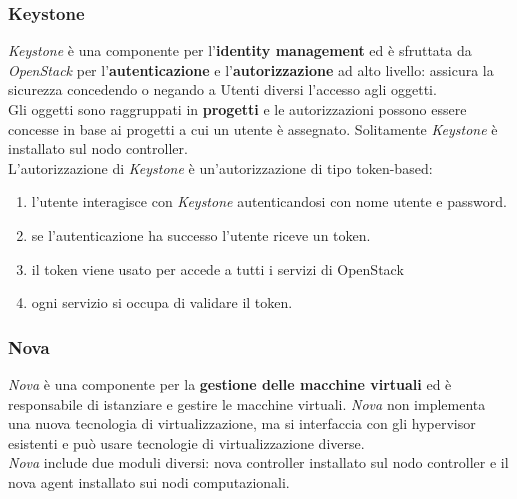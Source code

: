 \documentclass{article}
\begin{document}
\subsubsection{Keystone}
\textit{Keystone} è una componente per l'\textbf{identity management} ed è sfruttata da \textit{OpenStack} per l'\textbf{autenticazione} e l'\textbf{autorizzazione} ad alto livello: assicura la sicurezza concedendo o negando a Utenti diversi l'accesso agli oggetti.\\
Gli oggetti sono raggruppati in \textbf{progetti} e le autorizzazioni possono essere concesse in base ai progetti a cui un utente è assegnato.
Solitamente \textit{Keystone} è installato sul nodo controller.\\
L'autorizzazione di \textit{Keystone} è un'autorizzazione di tipo token-based: \begin{enumerate}
    \item l'utente interagisce con \textit{Keystone} autenticandosi con nome utente e password.
    \item se l'autenticazione ha successo l'utente riceve un token.
    \item il token viene usato per accede a tutti i servizi di OpenStack
    \item ogni servizio si occupa di validare il token.
\end{enumerate} 

\subsubsection{Nova}
\textit{Nova} è una componente per la \textbf{gestione delle macchine virtuali} ed è responsabile di istanziare e gestire le macchine virtuali. \textit{Nova} non implementa una nuova tecnologia di virtualizzazione, ma si interfaccia con gli hypervisor esistenti e può usare tecnologie di virtualizzazione diverse.\\
\textit{Nova} include due moduli diversi: nova controller installato sul nodo controller e il nova agent installato sui nodi computazionali.
\end{document}
